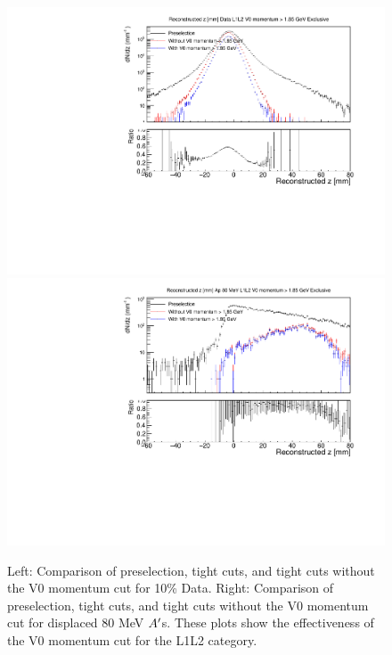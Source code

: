\begin{figure}[!ht] 
    \centering
    \includegraphics[width=.45\textwidth]{figs/selection/v0p_n_1_z_L1L2.pdf}
    \includegraphics[width=.45\textwidth]{figs/selection/ap_80MeV_vop_n_1_z_L1L2.pdf}
    \caption{
    	Left: Comparison of preselection, tight cuts, and tight cuts without the V0 momentum cut for 10\% Data. Right: Comparison of preselection, tight cuts, and tight cuts without the V0 momentum cut for displaced 80 MeV $A^\prime$s. These plots show the effectiveness of the V0 momentum cut for the L1L2 category.
    }
    \label{fig:v0p_L1L2}
\end{figure}  


